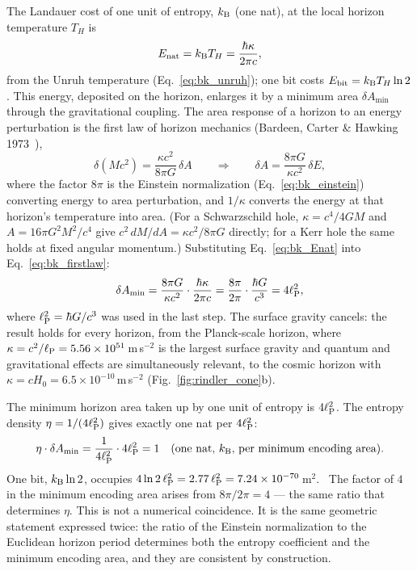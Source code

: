 The Landauer cost of one unit of entropy, $k_{\mathrm B}$ (one nat), at the local horizon temperature $T_H$ is
\begin{equation}
E_{\rm nat}=k_{\mathrm B} T_H=\frac{\hbar\kappa}{2\pi c},\label{eq:bk_Enat}
\end{equation}
from the Unruh temperature (Eq.~\eqref{eq:bk_unruh}); one bit costs $E_{\rm bit}=k_{\mathrm B} T_H\ln2$. This energy, deposited on the horizon, enlarges it by a minimum
area $\delta A_{\min}$ through the gravitational coupling. The area response of a horizon to an energy perturbation is the first law of horizon mechanics
(Bardeen, Carter \& Hawking 1973~\cite{BardeenCarterHawking1973}),
\begin{equation}
\delta(Mc^2)=\frac{\kappa c^2}{8\pi G}\,\delta A\qquad\Longrightarrow\qquad\delta A=\frac{8\pi G}{\kappa c^2}\,\delta E ,\label{eq:bk_firstlaw}
\end{equation}
where the factor $8\pi$ is the Einstein normalization (Eq.~\eqref{eq:bk_einstein}) converting energy to area perturbation, and $1/\kappa$ converts the energy at that
horizon's temperature into area. (For a Schwarzschild hole, $\kappa=c^4/4GM$ and $A=16\pi G^2M^2/c^4$ give $c^2\,dM/dA=\kappa c^2/8\pi G$ directly; for a Kerr
hole the same holds at fixed angular momentum.) Substituting Eq.~\eqref{eq:bk_Enat} into Eq.~\eqref{eq:bk_firstlaw}:
\begin{equation}
\delta A_{\min}=\frac{8\pi G}{\kappa c^2}\cdot\frac{\hbar\kappa}{2\pi c}=\frac{8\pi}{2\pi}\cdot\frac{\hbar G}{c^3}=4\ell_{\mathrm P}^2 ,\label{eq:bk_dAmin}
\end{equation}
where $\ell_{\mathrm P}^2=\hbar G/c^3$ was used in the last step. The surface gravity cancels: the result holds for every horizon, from the Planck-scale horizon, where
$\kappa=c^2/\ell_{\mathrm P}=5.56\times10^{51}$\,m\,s$^{-2}$ is the largest surface gravity and quantum and gravitational effects are simultaneously relevant, to the cosmic
horizon with $\kappa=cH_0=6.5\times10^{-10}$\,m\,s$^{-2}$ (Fig.~\ref{fig:rindler_cone}b). \derived

The minimum horizon area taken up by one unit of entropy is $4\ell_{\mathrm P}^2$. The entropy density $\eta=1/(4\ell_{\mathrm P}^2)$ gives exactly one nat per $4\ell_{\mathrm P}^2$:
\begin{equation}
\eta\cdot\delta A_{\min}=\frac{1}{4\ell_{\mathrm P}^2}\cdot4\ell_{\mathrm P}^2=1\quad\text{(one nat, $k_{\mathrm B}$, per minimum encoding area)}.\label{eq:bk_onenat}
\end{equation}
One bit, $k_{\mathrm B}\ln2$, occupies $4\ln2\,\ell_{\mathrm P}^2=2.77\,\ell_{\mathrm P}^2=7.24\times10^{-70}$\,m$^2$. \calc\ The factor of $4$ in the minimum encoding area arises from $8\pi/2\pi=4$ ---
the same ratio that determines $\eta$. This is not a numerical coincidence. It is the same geometric statement expressed twice: the ratio of the Einstein
normalization to the Euclidean horizon period determines both the entropy coefficient and the minimum encoding area, and they are consistent by
construction.

